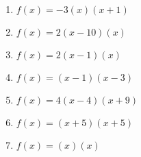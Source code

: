 \documentclass{article}%
\begin{document}
\begin{enumerate}[label=\alph*)]
\item%
\newline\vspace{0.5cm} $f(x)=-3(x)(x+1)$%
\item%
\newline\vspace{0.5cm} $f(x)=2(x-10)(x)$%
\item%
\newline\vspace{0.5cm} $f(x)=2(x-1)(x)$%
\item%
\newline\vspace{0.5cm} $f(x)=(x-1)(x-3)$%
\item%
\newline\vspace{0.5cm} $f(x)=4(x-4)(x+9)$%
\item%
\newline\vspace{0.5cm} $f(x)=(x+5)(x+5)$%
\item%
\newline\vspace{0.5cm} $f(x)=(x)(x)$%
\end{enumerate}

%
\end{document}
